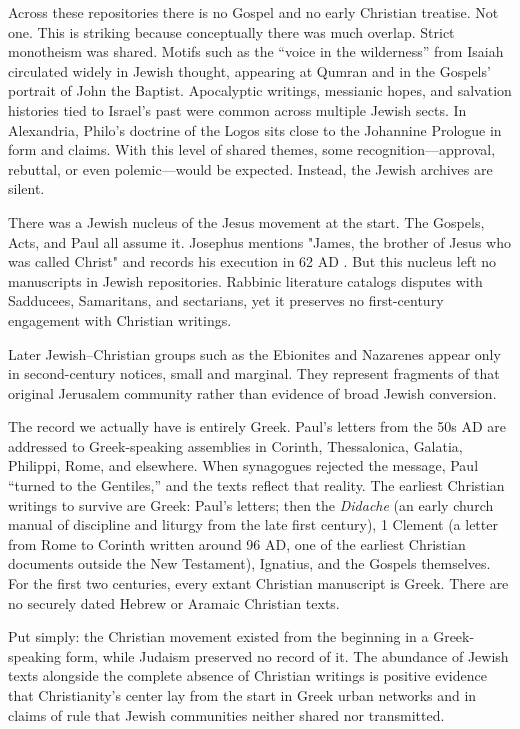 Across these repositories there is no Gospel and no early Christian treatise.
Not one.
This is striking because conceptually there was much overlap.
Strict monotheism was shared.
Motifs such as the “voice in the wilderness” from Isaiah circulated widely in Jewish thought, appearing at Qumran and in the Gospels’ portrait of John the Baptist.
Apocalyptic writings, messianic hopes, and salvation histories tied to Israel’s past were common across multiple Jewish sects.
In Alexandria, Philo’s doctrine of the Logos sits close to the Johannine Prologue in form and claims.
With this level of shared themes, some recognition---approval, rebuttal, or even polemic---would be expected.
Instead, the Jewish archives are silent.

There was a Jewish nucleus of the Jesus movement at the start.
The Gospels, Acts, and Paul all assume it.
Josephus mentions "James, the brother of Jesus who was called Christ" \cite[20.200]{josephus:ant} and records his execution in 62 AD .
But this nucleus left no manuscripts in Jewish repositories.
Rabbinic literature catalogs disputes with Sadducees, Samaritans, and sectarians, yet it preserves no first-century engagement with Christian writings.

Later Jewish--Christian groups such as the Ebionites and Nazarenes appear only in second-century notices, small and marginal.
They represent fragments of that original Jerusalem community rather than evidence of broad Jewish conversion.

The record we actually have is entirely Greek.
Paul’s letters from the 50s AD are addressed to Greek-speaking assemblies in Corinth, Thessalonica, Galatia, Philippi, Rome, and elsewhere.
When synagogues rejected the message, Paul “turned to the Gentiles,” and the texts reflect that reality.
The earliest Christian writings to survive are Greek: Paul's letters; then the \emph{Didache} (an early church manual of discipline and liturgy from the late first century), 1 Clement (a letter from Rome to Corinth written around 96 AD, one of the earliest Christian documents outside the New Testament), Ignatius, and the Gospels themselves.
For the first two centuries, every extant Christian manuscript is Greek.
There are no securely dated Hebrew or Aramaic Christian texts.

Put simply: the Christian movement existed from the beginning in a Greek-speaking form, while Judaism preserved no record of it.
The abundance of Jewish texts alongside the complete absence of Christian writings is positive evidence that Christianity’s center lay from the start in Greek urban networks and in claims of rule that Jewish communities neither shared nor transmitted.

